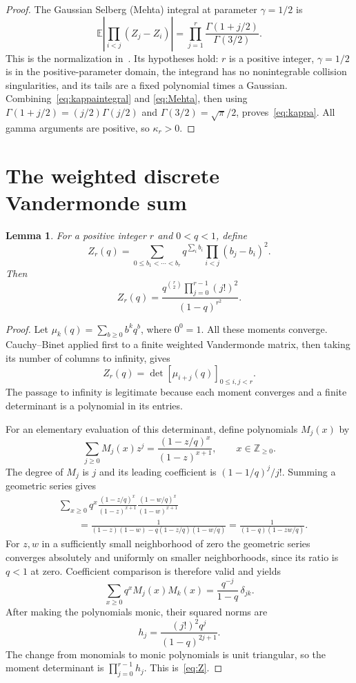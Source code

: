 \documentclass[11pt]{article}
\newtheorem{lemma}[theorem]{Lemma}
\theoremstyle{remark}
\newcommand{\E}{\mathbb E}
\newcommand{\Z}{\mathbb Z}
\begin{document}
\begin{proof}
The Gaussian Selberg (Mehta) integral at parameter $\gamma=1/2$ is
\begin{equation}\label{eq:Mehta}
 \E\left|\prod_{i<j}(Z_j-Z_i)\right|
 =\prod_{j=1}^r\frac{\Gamma(1+j/2)}{\Gamma(3/2)}.
\end{equation}
This is the normalization in~\cite[eqs.~(1.5)--(1.8)]{fw}. Its hypotheses hold:
$r$ is a positive integer, $\gamma=1/2$ is in the positive-parameter domain,
the integrand has no nonintegrable collision singularities, and its tails are
a fixed polynomial times a Gaussian. Combining~\eqref{eq:kappaintegral} and
\eqref{eq:Mehta}, then using $\Gamma(1+j/2)=(j/2)\Gamma(j/2)$ and
$\Gamma(3/2)=\sqrt\pi/2$, proves~\eqref{eq:kappa}. All gamma arguments are
positive, so $\kappa_r>0$.
\end{proof}

\section{The weighted discrete Vandermonde sum}

\begin{lemma}\label{lem:Z}
For a positive integer $r$ and $0<q<1$, define
\[
 Z_r(q)=\sum_{0\le b_1<\cdots<b_r}
          q^{\sum_i b_i}\prod_{i<j}(b_j-b_i)^2.
\]
Then
\begin{equation}\label{eq:Z}
 Z_r(q)=\frac{q^{\binom r2}\prod_{j=0}^{r-1}(j!)^2}{(1-q)^{r^2}}.
\end{equation}
\end{lemma}
\begin{proof}
Let $\mu_k(q)=\sum_{b\ge0}b^kq^b$, where $0^0=1$. All these moments converge.
Cauchy--Binet applied first to a finite weighted Vandermonde matrix, then taking
its number of columns to infinity, gives
\[
 Z_r(q)=\det[\mu_{i+j}(q)]_{0\le i,j<r}.
\]
The passage to infinity is legitimate because each moment converges and a finite
determinant is a polynomial in its entries.

For an elementary evaluation of this determinant, define polynomials $M_j(x)$ by
\[
 \sum_{j\ge0}M_j(x)z^j
 =\frac{(1-z/q)^x}{(1-z)^{x+1}},\qquad x\in\Z_{\ge0}.
\]
The degree of $M_j$ is $j$ and its leading coefficient is
$(1-1/q)^j/j!$. Summing a geometric series gives
\begin{align*}
 &\sum_{x\ge0}q^x
 \frac{(1-z/q)^x}{(1-z)^{x+1}}
 \frac{(1-w/q)^x}{(1-w)^{x+1}}\\
 &\qquad=\frac1{(1-z)(1-w)-q(1-z/q)(1-w/q)}
 =\frac1{(1-q)(1-zw/q)}.
\end{align*}
For $z,w$ in a sufficiently small neighborhood of zero the geometric series
converges absolutely and uniformly on smaller neighborhoods, since its ratio
is $q<1$ at zero. Coefficient comparison is therefore valid and yields
\[
 \sum_{x\ge0}q^xM_j(x)M_k(x)=\frac{q^{-j}}{1-q}\,\delta_{jk}.
\]
After making the polynomials monic, their squared norms are
\[
 h_j=\frac{(j!)^2q^j}{(1-q)^{2j+1}}.
\]
The change from monomials to monic polynomials is unit triangular, so the moment
determinant is $\prod_{j=0}^{r-1}h_j$. This is~\eqref{eq:Z}.
\end{proof}
\end{document}
